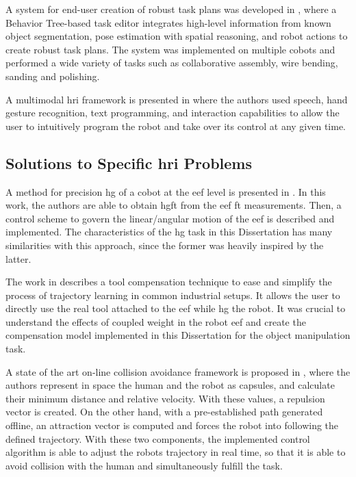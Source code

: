 \par A system for end-user creation of robust task plans was developed in \cite{colab.costar}, where a Behavior Tree-based task editor integrates high-level information from known object segmentation, pose estimation with spatial reasoning, and robot actions to create robust task plans. The system was implemented on multiple cobots and performed a wide variety of tasks such as collaborative assembly, wire bending, sanding and polishing.

\par A multimodal \ac{hri} framework is presented in \cite{colab.multimodal} where the authors used speech, hand gesture recognition, text programming, and interaction capabilities to allow the user to intuitively program the robot and take over its control at any given time. 



\subsection{Solutions to Specific \acs{hri} Problems}

\par A method for precision \ac{hg} of a cobot at the \ac{eef} level is presented in \cite{spec.handguide}. In this work, the authors are able to obtain \ac{hgft} from the \ac{eef} \ac{ft} measurements. Then, a control scheme to govern the linear/angular motion of the \ac{eef} is described and implemented. The characteristics of the \ac{hg} task in this Dissertation has many similarities with this approach, since the former was heavily inspired by the latter.

\par The work in \cite{spec.compensation} describes a tool compensation technique to ease and simplify the process of trajectory learning in common industrial setups. It allows the user to directly use the real tool attached to the \ac{eef} while \ac{hg} the robot. It was crucial to understand the effects of coupled weight in the robot \ac{eef} and create the compensation model implemented in this Dissertation for the object manipulation task.

\par A state of the art on-line collision avoidance framework is proposed in \cite{spec.collision}, where the authors represent in space the human and the robot as capsules, and calculate their minimum distance and relative velocity. With these values, a repulsion vector is created. On the other hand, with a pre-established path generated offline, an attraction vector is computed and forces the robot into following the defined trajectory. With these two components, the implemented control algorithm is able to adjust the robots trajectory in real time, so that it is able to avoid collision with the human and simultaneously fulfill the task.

